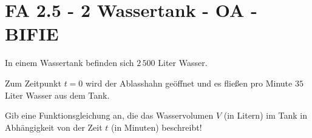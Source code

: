 \section{FA 2.5 - 2 Wassertank - OA - BIFIE}

\begin{beispiel}[FA 2.5]{1} %
In einem Wassertank befinden sich $2\,500$ Liter Wasser.

Zum Zeitpunkt $t=0$ wird der Ablasshahn geöffnet und es fließen pro Minute $35$ Liter Wasser aus dem Tank.

Gib eine Funktionsgleichung an, die das Wasservolumen $V$ (in Litern) im Tank in Abhängigkeit von der Zeit $t$ (in Minuten) beschreibt!
\leer

\end{beispiel}